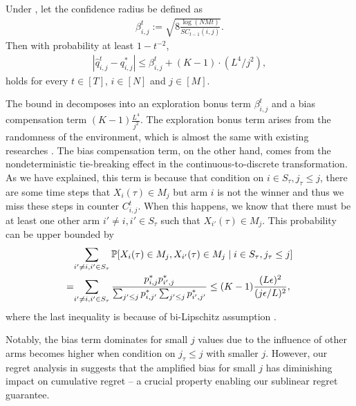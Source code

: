 \begin{lemma}\label{lemma:concentration}
Under , let the confidence radius be defined as  
\begin{align}\label{eq:def-beta}
    \beta_{i,j}^t := \sqrt{8\frac{\log(NMt)}{SC_{t-1}(i,j)}}.
\end{align}
Then with probability at least $1 - t^{-2}$,
\begin{align}
    \left|\hat q_{i,j}^t - q^*_{i,j}\right| \le {\beta_{i,j}^t} + (K-1)\cdot(L^4/j^2),
\end{align}
holds for every $t \in [T]$, $i \in [N]$ and $j \in [M]$.
\end{lemma}

The bound in  decomposes into an exploration bonus term $\beta_{i,j}^t$ and a bias compensation term $(K-1)\frac{L^4}{j^2}$. The exploration bonus term arises from the randomness of the environment, which is almost the same with existing researches \citep{wang2017improving,liu2023contextual,wang2023combinatorial}.
The bias compensation term, on the other hand, comes from the nondeterministic tie-breaking effect in the continuous-to-discrete transformation. 
%
As we have explained, this term is because that condition on $i\in S_\tau, j_\tau \le j$, there are some time steps that $X_i(\tau) \in M_j$ but arm $i$ is not the winner and thus we miss these steps in counter $C_{i,j}^t$.
%
When this happens, we know that there must be at least one other arm $i'\ne i, i'\in S_{\tau}$ such that $X_{i'}(\tau) \in M_j$.
%
This probability can be upper bounded by 
\begin{align*}
    &\sum_{i'\ne i, i'\in S_{\tau}} {\mathbb{P}}[X_i(\tau) \in M_j, X_{i'}(\tau) \in M_j \mid i\in S_\tau, j_\tau \le j]\\
    =\!&\sum_{i'\ne i, i'\in S_{\tau}} \frac{p^*_{i,j}p^*_{i',j} }{ \sum_{j'\le j}p^*_{i,j'} \sum_{j'\le j}p^*_{i',j'}} \le (K-1)\frac{(L\epsilon)^2}{(j\epsilon/L)^2},
\end{align*}
where the last inequality is because of bi-Lipschitz assumption .


Notably, the bias term dominates for small $j$ values due to the influence of other arms becomes higher when condition on $j_\tau \le j$ with smaller $j$.
%
However, our regret analysis in  suggests that the amplified bias for small $j$ has diminishing impact on cumulative regret -- a crucial property enabling our sublinear regret guarantee.




